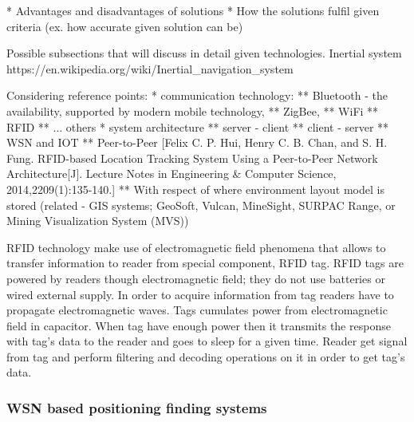 \documentclass[../main.tex]{subfiles}
\begin{document}
* Advantages and disadvantages of solutions
* How the solutions fulfil given criteria (ex. how accurate given solution can be)

Possible subsections that will discuss in detail given technologies.
Inertial system
https://en.wikipedia.org/wiki/Inertial_navigation_system

Considering reference points:
* communication technology:
** Bluetooth - the availability, supported by modern mobile technology,
** ZigBee,
** WiFi
** RFID
** ... others
* system architecture
** server - client
** client - server
** WSN and IOT
** Peer-to-Peer [Felix C. P. Hui, Henry C. B. Chan, and S. H. Fung. RFID-based Location Tracking System Using
a Peer-to-Peer Network Architecture[J]. Lecture Notes in Engineering & Computer Science,
2014,2209(1):135-140.]
** With respect of where environment layout model is stored (related - GIS systems; GeoSoft, Vulcan, MineSight, SURPAC Range, or
Mining Visualization System (MVS))

RFID technology make use of electromagnetic field phenomena that allows to transfer information to reader from special component, RFID tag. RFID tags are powered by readers though electromagnetic field; they do not use batteries or wired external supply. In order to acquire information from tag readers have to propagate electromagnetic waves. Tags cumulates power from electromagnetic field in capacitor. When tag have enough power then it transmits the response with tag's data to the reader and goes to sleep for a given time. Reader get signal from tag and perform filtering and decoding operations on it in order to get tag's data.


\subsubsection{WSN based positioning finding systems} %
\label{ssub:wsn_based_positioning_finding_systems}
\end{document}
